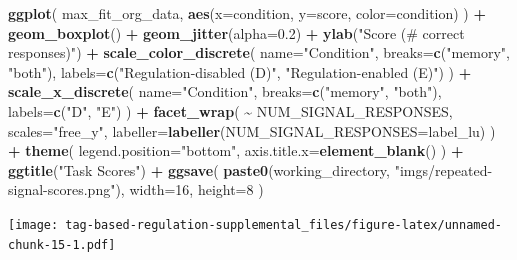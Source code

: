 \documentclass[
]{book}
\newenvironment{Shaded}{\begin{snugshade}}{\end{snugshade}}
\newcommand{\DataTypeTok}[1]{\textcolor[rgb]{0.13,0.29,0.53}{#1}}
\newcommand{\DecValTok}[1]{\textcolor[rgb]{0.00,0.00,0.81}{#1}}
\newcommand{\FloatTok}[1]{\textcolor[rgb]{0.00,0.00,0.81}{#1}}
\newcommand{\KeywordTok}[1]{\textcolor[rgb]{0.13,0.29,0.53}{\textbf{#1}}}
\newcommand{\NormalTok}[1]{#1}
\newcommand{\OperatorTok}[1]{\textcolor[rgb]{0.81,0.36,0.00}{\textbf{#1}}}
\newcommand{\StringTok}[1]{\textcolor[rgb]{0.31,0.60,0.02}{#1}}
\begin{document}
\begin{Shaded}
\begin{Highlighting}[]
\KeywordTok{ggplot}\NormalTok{( max\_fit\_org\_data, }\KeywordTok{aes}\NormalTok{(}\DataTypeTok{x=}\NormalTok{condition, }\DataTypeTok{y=}\NormalTok{score, }\DataTypeTok{color=}\NormalTok{condition) ) }\OperatorTok{+}
\StringTok{  }\KeywordTok{geom\_boxplot}\NormalTok{() }\OperatorTok{+}
\StringTok{  }\KeywordTok{geom\_jitter}\NormalTok{(}\DataTypeTok{alpha=}\FloatTok{0.2}\NormalTok{) }\OperatorTok{+}
\StringTok{  }\KeywordTok{ylab}\NormalTok{(}\StringTok{"Score (\# correct responses)"}\NormalTok{) }\OperatorTok{+}
\StringTok{  }\KeywordTok{scale\_color\_discrete}\NormalTok{(}
    \DataTypeTok{name=}\StringTok{"Condition"}\NormalTok{,}
    \DataTypeTok{breaks=}\KeywordTok{c}\NormalTok{(}\StringTok{"memory"}\NormalTok{, }\StringTok{"both"}\NormalTok{),}
    \DataTypeTok{labels=}\KeywordTok{c}\NormalTok{(}\StringTok{"Regulation{-}disabled (D)"}\NormalTok{, }\StringTok{"Regulation{-}enabled (E)"}\NormalTok{)}
\NormalTok{  ) }\OperatorTok{+}
\StringTok{  }\KeywordTok{scale\_x\_discrete}\NormalTok{(}
    \DataTypeTok{name=}\StringTok{"Condition"}\NormalTok{,}
    \DataTypeTok{breaks=}\KeywordTok{c}\NormalTok{(}\StringTok{"memory"}\NormalTok{, }\StringTok{"both"}\NormalTok{),}
    \DataTypeTok{labels=}\KeywordTok{c}\NormalTok{(}\StringTok{"D"}\NormalTok{, }\StringTok{"E"}\NormalTok{)}
\NormalTok{  ) }\OperatorTok{+}
\StringTok{  }\KeywordTok{facet\_wrap}\NormalTok{(}
    \OperatorTok{\textasciitilde{}}\StringTok{ }\NormalTok{NUM\_SIGNAL\_RESPONSES,}
    \DataTypeTok{scales=}\StringTok{"free\_y"}\NormalTok{,}
    \DataTypeTok{labeller=}\KeywordTok{labeller}\NormalTok{(}\DataTypeTok{NUM\_SIGNAL\_RESPONSES=}\NormalTok{label\_lu)}
\NormalTok{  ) }\OperatorTok{+}
\StringTok{  }\KeywordTok{theme}\NormalTok{(}
    \DataTypeTok{legend.position=}\StringTok{"bottom"}\NormalTok{,}
    \DataTypeTok{axis.title.x=}\KeywordTok{element\_blank}\NormalTok{()}
\NormalTok{  ) }\OperatorTok{+}
\StringTok{  }\KeywordTok{ggtitle}\NormalTok{(}\StringTok{"Task Scores"}\NormalTok{) }\OperatorTok{+}
\StringTok{  }\KeywordTok{ggsave}\NormalTok{(}
    \KeywordTok{paste0}\NormalTok{(working\_directory, }\StringTok{"imgs/repeated{-}signal{-}scores.png"}\NormalTok{),}
    \DataTypeTok{width=}\DecValTok{16}\NormalTok{,}
    \DataTypeTok{height=}\DecValTok{8}
\NormalTok{  )}
\end{Highlighting}
\end{Shaded}

\texttt{[image: tag-based-regulation-supplemental\_files/figure-latex/unnamed-chunk-15-1.pdf]}
\end{document}

